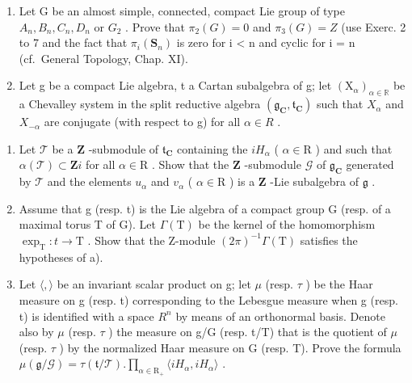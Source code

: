 \begin{enumerate}
\def\labelenumi{\arabic{enumi})}
\setcounter{enumi}{7}
\item
  Let G be an almost simple, connected, compact Lie group of type \(A_{n}, B_{n}, C_{n}, D_{n}\) or \(G_{2}\) . Prove that \(\pi_{2}(G) = 0\) and \(\pi_{3}(G) = Z\) (use Exerc. 2 to 7 and the fact that \(\pi_{i}(\mathbf{S}_{n})\) is zero for i \textless{} n and cyclic for i = n (cf.~General Topology, Chap. XI).
\item
  Let g be a compact Lie algebra, t a Cartan subalgebra of g; let \((\mathrm{X}_{\alpha})_{\alpha\in\mathbb{R}}\) be a Chevalley system in the split reductive algebra \((\mathfrak{g}_{\mathbf{C}},\mathfrak{t}_{\mathbf{C}})\) such that \(X_{\alpha}\) and \(X_{-\alpha}\) are conjugate (with respect to g) for all \(\alpha\in R\) .
\end{enumerate}

\begin{enumerate}
\def\labelenumi{\alph{enumi})}
\item
  Let \(\mathcal{T}\) be a \(\mathbf{Z}\) -submodule of \(\mathfrak{t}_{\mathbf{C}}\) containing the \(iH_{\alpha}\) ( \(\alpha \in \mathrm{R}\) ) and such that \(\alpha(\mathcal{T}) \subset \mathbf{Z}i\) for all \(\alpha \in \mathrm{R}\) . Show that the \(\mathbf{Z}\) -submodule \(\mathcal{G}\) of \(\mathfrak{g}_{\mathbf{C}}\) generated by \(\mathcal{T}\) and the elements \(u_{\alpha}\) and \(v_{\alpha}\) ( \(\alpha \in \mathrm{R}\) ) is a \(\mathbf{Z}\) -Lie subalgebra of \(\mathfrak{g}\) .
\item
  Assume that g (resp. t) is the Lie algebra of a compact group G (resp. of a maximal torus T of G). Let \(\Gamma(\mathrm{T})\) be the kernel of the homomorphism \(\exp_{\mathrm{T}}:t\to\mathrm{T}\) . Show that the Z-module \((2\pi)^{-1}\varGamma(\mathrm{T})\) satisfies the hypotheses of a).
\item
  Let \(\langle,\rangle\) be an invariant scalar product on g; let \(\mu\) (resp. \(\tau\) ) be the Haar measure on g (resp. t) corresponding to the Lebesgue measure when g (resp. t) is identified with a space \(R^{n}\) by means of an orthonormal basis. Denote also by \(\mu\) (resp. \(\tau\) ) the measure on g/G (resp. t/T) that is the quotient of \(\mu\) (resp. \(\tau\) ) by the normalized Haar measure on G (resp. T). Prove the formula \(\mu(\mathfrak{g}/\mathcal{G})=\tau(\mathfrak{t}/\mathcal{T}).\prod_{\alpha\in\mathrm{R}_{+}}\langle iH_{\alpha},iH_{\alpha}\rangle\) .
\end{enumerate}

